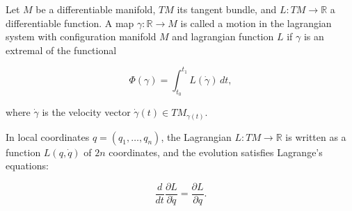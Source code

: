 Let $M$ be a differentiable manifold, $TM$ its tangent bundle, and $L: TM \to \mathbb{R}$ a differentiable function. A map $\gamma: \mathbb{R} \to M$ is called a motion in the lagrangian system with configuration manifold $M$ and lagrangian function $L$ if $\gamma$ is an extremal of the functional

$$\Phi(\gamma) = \int_{t_0}^{t_1} L(\dot{\gamma})\, dt,$$

where $\dot{\gamma}$ is the velocity vector $\dot{\gamma}(t) \in TM_{\gamma(t)}$.

In local coordinates $q = (q_1, \ldots, q_n)$, the Lagrangian $L: TM \to \mathbb{R}$ is written as a function $L(q, \dot{q})$ of $2n$ coordinates, and the evolution satisfies Lagrange's equations:

$$\frac{d}{dt} \frac{\partial L}{\partial \dot{q}} = \frac{\partial L}{\partial q}.$$
